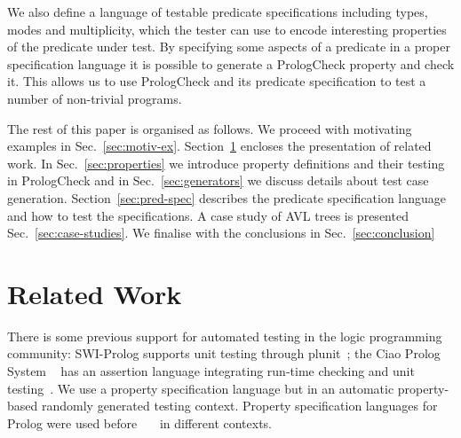 \documentclass[runningheads,a4paper]{llncs}
\newcommand{\refSec}[1]{Sec.~\ref{#1}}
\newcommand{\refSecI}[1]{Section~\ref{#1}}
\newcommand{\Prolog}[0]{{\sf Prolog}}
\newcommand{\plqc}[0]{{\sf PrologCheck}}
\begin{document}
We also define a language of testable predicate specifications including
types, modes and multiplicity, which the tester can use to encode
interesting properties of the predicate under test.
%
By specifying some aspects of a predicate in a proper specification
language it is possible to generate a \plqc{} property and check it.
%
This allows us to  use \plqc{} and its predicate specification to test a
number of non-trivial programs.




The rest of this paper is organised as follows.
%
We proceed with motivating examples in
\refSec{sec:motiv-ex}. 
%
\refSecI{sec:rel-work} encloses the presentation of related work.
%
In \refSec{sec:properties} we introduce property definitions and their
testing in \plqc{} and in \refSec{sec:generators} we discuss details
about test case generation.
%
\refSecI{sec:pred-spec} describes the predicate specification language
and how to test the specifications.
%
A case study of AVL trees is presented \refSec{sec:case-studies}. 
%
We finalise with the conclusions in \refSec{sec:conclusion}



\section{Related Work} 
\label{sec:rel-work}


There is some previous support for automated testing in the logic programming
community:
%
{\sf SWI-Prolog} supports unit testing through {\sf plunit}~\cite{swi-prolog};
%
the {\sf Ciao Prolog System} ~\cite{ciao-prolog} has an assertion language
integrating run-time checking and unit testing~\cite{ciao-assert-unit}.
%
We use a property specification language but in an
automatic property-based randomly generated testing context.
%
Property specification languages for \Prolog{} were used
before~\cite{Deville1990logprog}~\cite{ciao-assert-unit}~\cite{somogyi1995mercury} in
different contexts.
\end{document}

